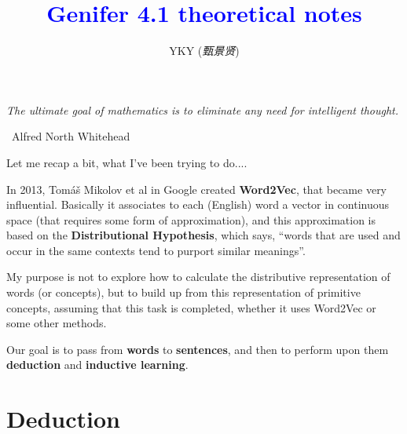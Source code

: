 \documentclass[12pt]{article}
\title{\textcolor{blue}{Genifer 4.1 theoretical notes}}
\author{YKY (\textit{甄景贤})}
\newcommand{\tab}{\hspace*{1cm}}
\begin{document}
\tab\tab\tab \parbox{9cm}{\textit{The ultimate goal of mathematics is to eliminate any need for intelligent thought.}}
\begin{flushright}
\textemdash\, Alfred North Whitehead \hspace{1cm}
\end{flushright}

\sffamily

{\let\newpage\relax\maketitle}

\maketitle
\setlength{\parindent}{0em}
\setlength{\parskip}{1.5ex plus0.5ex minus1.2ex}

Let me recap a bit, what I've been trying to do....


In 2013, Tom\'{a}\v{s} Mikolov et al in Google created \textbf{Word2Vec}, that became very influential.  Basically it associates to each (English) word a vector in continuous space (that requires some form of approximation), and this approximation is based on the \textbf{Distributional Hypothesis}, which says, ``words that are used and occur in the same contexts tend to purport similar meanings''.

My purpose is not to explore how to calculate the distributive representation of words (or concepts), but to build up from this representation of primitive concepts, assuming that this task is completed, whether it uses Word2Vec or some other methods.


Our goal is to pass from \textbf{words} to \textbf{sentences}, and then to perform upon them \textbf{deduction} and \textbf{inductive learning}.

\section{Deduction}
\end{document}
